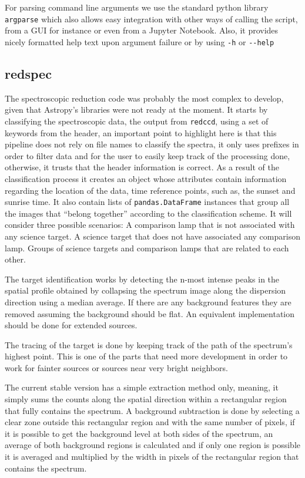 \documentclass[11pt,twoside]{article}
\begin{document}
For parsing command line arguments we use the standard python library \verb=argparse= which
also allows easy integration with other ways of calling the script, from a GUI 
for instance or even from a Jupyter Notebook. Also, it provides nicely formatted 
help text upon argument failure or by using \verb=-h= or \verb=--help=

\subsection{redspec}

The spectroscopic reduction code was probably the most complex to develop, given
that Astropy's libraries were not ready at the moment. It starts by classifying 
the spectroscopic data, the output from \verb=redccd=, using a set of keywords 
from the header, an important point to highlight here is that this pipeline does not
rely on file names to classify the spectra, it only uses prefixes in order to filter
data and for the user to easily keep track of the processing done, otherwise, it
trusts that the header information is correct. As a result of the classification 
process it creates an object whose attributes contain information regarding the location
of the data, time reference points, such as, the sunset and sunrise time. It also
contain lists of \verb=pandas.DataFrame= instances that group all the images that
``belong together'' according to the classification scheme. It will consider three
possible scenarios: A comparison lamp that is not associated with any science target.
A science target that does not have associated any comparison lamp.
Groups of science targets and comparison lamps that are related to each other.

The target identification works by detecting the n-most intense peaks in the spatial
profile obtained by collapsing the spectrum image along the dispersion direction using
a median average. If there are any background features they are removed assuming the background 
should be flat. An equivalent implementation should be done for extended sources.

The tracing of the target is done by keeping track of the path of the spectrum's highest
point. This is one of the parts that need more development in order to work for fainter
sources or sources near very bright neighbors.

The current stable version has a simple extraction method only, meaning, it simply
sums the counts along the spatial direction within a rectangular region that
fully contains the spectrum.
A background subtraction is done by selecting a clear zone outside this rectangular
region and with the same number of pixels, if it is possible to get the background
level at both sides of the spectrum, an average of both background regions is 
calculated and if only one region is possible it is averaged and multiplied by
the width in pixels of the rectangular region that contains the spectrum.
\end{document}
